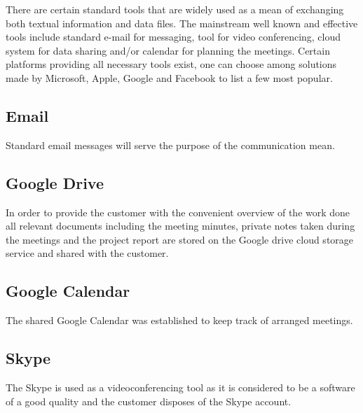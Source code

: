 There are certain standard tools that are widely used as a mean of exchanging both textual information and data files. The mainstream well known and effective tools include standard e-mail for messaging, tool for video conferencing, cloud system for data sharing and/or calendar for planning the meetings. Certain platforms providing all necessary tools exist, one can choose among solutions made by Microsoft, Apple, Google and Facebook to list a few most popular.


\subsection{Email}
Standard email messages will serve the purpose of the communication mean.


\subsection{Google Drive}
In order to provide the customer with the convenient overview of the work done all relevant documents including the meeting minutes, private notes taken during the meetings and the project report are stored on the Google drive cloud storage service and shared with the customer.


\subsection{Google Calendar}
The shared Google Calendar was established to keep track of arranged meetings.


\subsection{Skype}
The Skype is used as a videoconferencing tool as it is considered to be a software of a good quality and the customer disposes of the Skype account.


